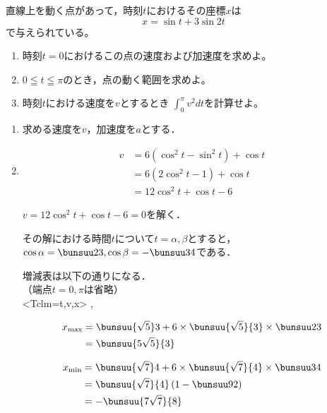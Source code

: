 \begin{problem}
直線上を動く点があって，時刻$t$におけるその座標$x$は
\[ x=\sin t+3\sin2t \]
で与えられている。
\begin{enumerate}
\item 時刻$t=0$におけるこの点の速度および加速度を求めよ。
\item $0 \leqq t \leqq \pi$のとき，点の動く範囲を求めよ。
\item 時刻$t$における速度を$v$とするとき
$\displaystyle\int_0^\pi v^2dt$を計算せよ。
\end{enumerate}
\end{problem}

\begin{enumerate}
  \item 求める速度を$v$，加速度を$a$とする．



  \item \begin{align*}
    v &= 6(\cos^2t-\sin^2t) + \cos t\\
    &= 6(2\cos^2t-1) + \cos t\\
    &= 12\cos^2 t + \cos t - 6
  \end{align*}

  $v = 12\cos^2t + \cos t - 6 = 0$を解く．

  その解における時間$t$について$t = \alpha,\beta$とすると，
  $\cos \alpha = \bunsuu23, \cos\beta = -\bunsuu34$である．

  増減表は以下の通りになる．\\（端点$t=0,\pi$は省略）\\
  \zougenhyou%
  <Tclm={t,v,x}>%
  {\alpha,\beta}

  \begin{align*}
    x_{\mathrm{max}} &= \bunsuu{\sqrt5}3 + 6\times\bunsuu{\sqrt{5}}{3}\times\bunsuu23\\
    &=\bunsuu{5\sqrt5}{3}
  \end{align*}

  \begin{align*}
    x_{\mathrm{min}} &= \bunsuu{\sqrt7}4 + 6\times\bunsuu{\sqrt{7}}{4}\times\bunsuu34\\
    &=\bunsuu{\sqrt7}{4}\left(1-\bunsuu92\right)\\
    &=-\bunsuu{7\sqrt7}{8}
  \end{align*}


\end{enumerate}
